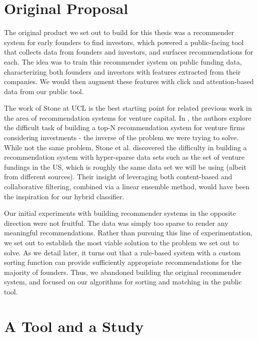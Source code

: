 \section{Original Proposal}

The original product we set out to build for this thesis was a recommender system for early founders to find investors, which powered a public-facing tool that collects data from founders and investors, and surfaces recommendations for each. The idea was to train this recommender system on public funding data, characterizing both founders and investors with features extracted from their companies. We would then augment these features with click and attention-based data from our public tool.

The work of Stone at UCL is the best starting point for related previous work in the area of recommendation systems for venture capital. In \cite{Stone:2013:EST:2541167.2507882}, the authors explore the difficult task of building a top-N recommendation system for venture firms considering investments - the inverse of the problem we were trying to solve. While not the same problem, Stone et al. discovered the difficulty in building a recommendation system with hyper-sparse data sets such as the set of venture fundings in the US, which is roughly the same data set we will be using (albeit from different sources). Their insight of leveraging both content-based and collaborative filtering, combined via a linear ensemble method, would have been the inspiration for our hybrid classifier.

Our initial experiments with building recommender systems in the opposite direction were not fruitful. The data was simply too sparse to render any meaningful recommendations. Rather than pursuing this line of experimentation, we set out to establish the most viable solution to the problem we set out to solve. As we detail later, it turns out that a rule-based system with a custom sorting function can provide sufficiently appropriate recommendations for the majority of founders. Thus, we abandoned building the original recommender system, and focused on our algorithms for sorting and matching in the public tool.

\section{A Tool and a Study}

